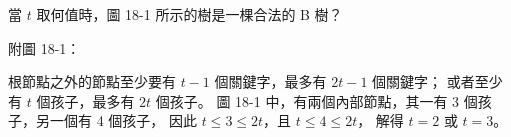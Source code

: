 \startEXERCISE
當 $t$ 取何值時，圖 18-1 所示的樹是一棵合法的 B 樹？

附圖 18-1：

\externalfigure[fig18-1-1]
\stopEXERCISE

\startANSWER
根節點之外的節點至少要有 $t-1$ 個關鍵字，最多有 $2t-1$ 個關鍵字；
或者至少有 $t$ 個孩子，最多有 $2t$ 個孩子。
圖 18-1 中，有兩個內部節點，其一有 3 個孩子，另一個有 4 個孩子，
因此 $t\le 3\le 2t$，且 $t\le 4\le 2t$，
解得 $t=2$ 或 $t=3$。
\stopANSWER
